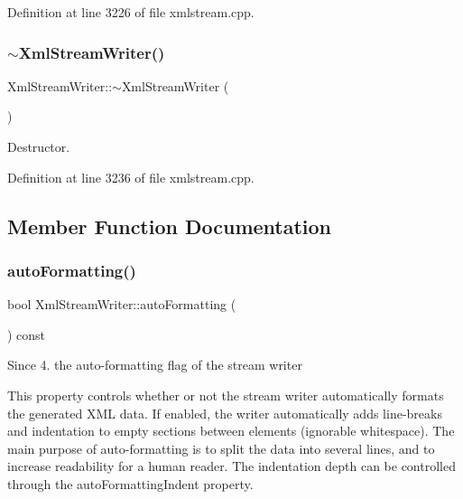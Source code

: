 Definition at line 3226 of file xmlstream.\+cpp.

\mbox{\label{class_xml_stream_writer_a0cd28f6b6ce9ad95831b35d6823a8ecb}} 
\subsubsection{\texorpdfstring{$\sim$\+Xml\+Stream\+Writer()}{~XmlStreamWriter()}}
{\footnotesize\ttfamily Xml\+Stream\+Writer\+::$\sim$\+Xml\+Stream\+Writer (\begin{DoxyParamCaption}{ }\end{DoxyParamCaption})}

Destructor. 

Definition at line 3236 of file xmlstream.\+cpp.



\subsection{Member Function Documentation}
\mbox{\label{class_xml_stream_writer_a257ecf97cf02f3ca8cb86c2ecf425a8c}} 
\subsubsection{\texorpdfstring{auto\+Formatting()}{autoFormatting()}}
{\footnotesize\ttfamily bool Xml\+Stream\+Writer\+::auto\+Formatting (\begin{DoxyParamCaption}{ }\end{DoxyParamCaption}) const}

\begin{DoxySince}{Since}
4. the auto-\/formatting flag of the stream writer
\end{DoxySince}
This property controls whether or not the stream writer automatically formats the generated X\+ML data. If enabled, the writer automatically adds line-\/breaks and indentation to empty sections between elements (ignorable whitespace). The main purpose of auto-\/formatting is to split the data into several lines, and to increase readability for a human reader. The indentation depth can be controlled through the  auto\+Formatting\+Indent property.

